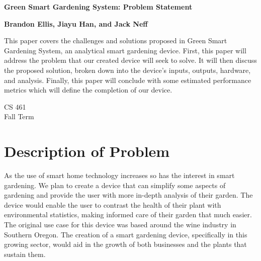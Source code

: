 \documentclass[IEEEtran,letterpaper,10pt,titlepage,fleqn,draftclsnofoot,onecolumn]{article}
\begin{document}
\begin{titlepage}
	\begin{center}
		\vspace*{1cm}
		
		\huge
		\textbf{Green Smart Gardening System: Problem Statement}
        
        \vspace{1.5cm}
        
		\large
        \textbf{Brandon Ellis, Jiayu Han, and Jack Neff}
		
		\vspace{5cm}
		
		\normalsize
		This paper covers the challenges and solutions proposed in Green Smart Gardening System, an analytical smart gardening device. First, this paper will address the problem that our created device will seek to solve. It will then discuss the proposed solution, broken down into the device’s inputs, outputs, hardware, and analysis. Finally, this paper will conclude with some estimated performance metrics which will define the completion of our device.
		
		\vfill
        
		\large
        CS 461\\
        Fall Term\\
    \end{center}
\end{titlepage}

\section{Description of Problem}

As the use of smart home technology increases so has the interest in smart gardening. We plan to create a device that can simplify some aspects of gardening and provide the user with more in-depth analysis of their garden. The device would enable the user to contrast the health of their plant with environmental statistics, making informed care of their garden that much easier. The original use case for this device was based around the wine industry in Southern Oregon. The creation of a smart gardening device, specifically in this growing sector, would aid in the growth of both businesses and the plants that sustain them. 

\vspace{5mm}
\end{document}

